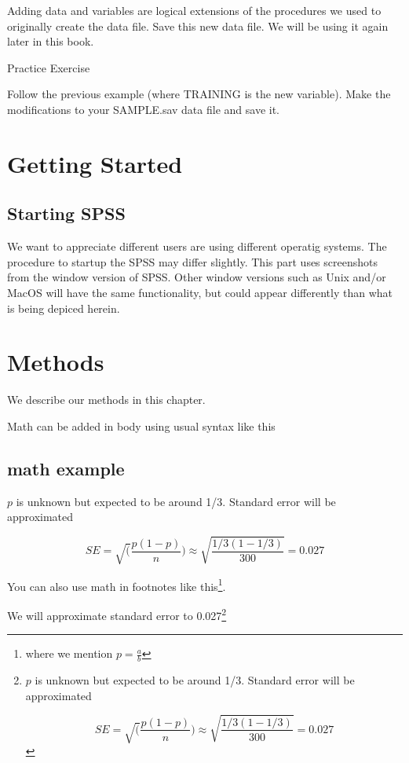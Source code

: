 \documentclass[
]{book}
\begin{document}
Adding data and variables are logical extensions of the procedures we used to originally create the data file. Save this new data file. We will be using it again later in this book.

Practice Exercise

Follow the previous example (where TRAINING is the new variable). Make the modifications to your SAMPLE.sav data file and save it.

\hypertarget{getting-started-1}{%
\chapter{Getting Started}\label{getting-started-1}}

\hypertarget{starting-spss-1}{%
\section{Starting SPSS}\label{starting-spss-1}}

We want to appreciate different users are using different operatig systems. The procedure to startup the SPSS may differ slightly.
This part uses screenshots from the window version of SPSS. Other window versions such as Unix and/or MacOS will have the same functionality, but could appear differently than what is being depiced herein.

\hypertarget{methods}{%
\chapter{Methods}\label{methods}}

We describe our methods in this chapter.

Math can be added in body using usual syntax like this

\hypertarget{math-example}{%
\section{math example}\label{math-example}}

\(p\) is unknown but expected to be around 1/3. Standard error will be approximated

\[
SE = \sqrt(\frac{p(1-p)}{n}) \approx \sqrt{\frac{1/3 (1 - 1/3)} {300}} = 0.027
\]

You can also use math in footnotes like this\footnote{where we mention \(p = \frac{a}{b}\)}.

We will approximate standard error to 0.027\footnote{\(p\) is unknown but expected to be around 1/3. Standard error will be approximated

  \[
  SE = \sqrt(\frac{p(1-p)}{n}) \approx \sqrt{\frac{1/3 (1 - 1/3)} {300}} = 0.027
  \]}
\end{document}

